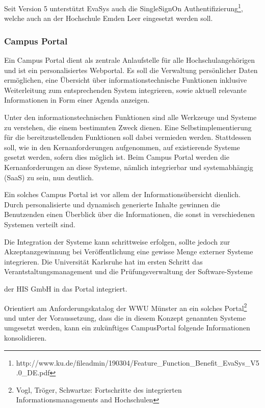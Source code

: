 \documentclass[a4paper]{article}
\begin{document}
{\sffamily
Seit Version 5 unterstützt EvaSys auch die SingleSignOn
Authentifizierung\footnote{http://www.ku.de/fileadmin/190304/Feature\_Function\_Benefit\_EvaSys\_V5.0\_DE.pdf}, welche
auch an der Hochschule Emden Leer eingesetzt werden soll.}

\subsubsection{Campus Portal}
{\sffamily
Ein Campus Portal dient als zentrale Anlaufstelle für alle Hochschulangehörigen und ist ein personalisiertes Webportal.
Es soll die Verwaltung persönlicher Daten ermöglichen, eine Übersicht über informationstechnische Funktionen inklusive
Weiterleitung zum entsprechenden System integrieren, sowie aktuell relevante Informationen in Form einer Agenda
anzeigen.}

{\sffamily
Unter den informationstechnischen Funktionen sind alle Werkzeuge und Systeme zu verstehen, die einem bestimmten Zweck
dienen. Eine Selbstimplementierung für die bereitzustellenden Funktionen soll dabei vermieden werden. Stattdessen soll,
wie in den Kernanforderungen aufgenommen, auf existierende Systeme gesetzt werden, sofern dies möglich ist. Beim Campus
Portal werden die Kernanforderungen an diese Systeme, nämlich integrierbar und systemabhängig (SaaS) zu sein, nun
deutlich.}

{\sffamily
Ein solches Campus Portal ist vor allem der Informationsübersicht dienlich. Durch personalisierte und dynamisch
generierte Inhalte gewinnen die Benutzenden einen Überblick über die Informationen, die sonst in verschiedenen Systemen
verteilt sind.}

{\sffamily
Die Integration der Systeme kann schrittweise erfolgen, sollte jedoch zur Akzeptanzgewinnung bei Veröffentlichung eine
gewisse Menge externer Systeme integrieren. Die Universität Karlsruhe hat im ersten Schritt das
Verantstaltungsmanagement und die Prüfungsverwaltung der Software-Systeme}


\bigskip

der HIS GmbH in das Portal integriert.

{\sffamily
Orientiert am Anforderungskatalog der WWU Münster an ein solches Portal\footnote{Vogl, Tröger, Schwartze: Fortschritte
des integrierten Informationsmanagements and Hochschulen} und unter der Voraussetzung, dass die in diesem Konzept
genannten Systeme umgesetzt werden, kann ein zukünftiges CampusPortal folgende Informationen konsolidieren.}
\end{document}
